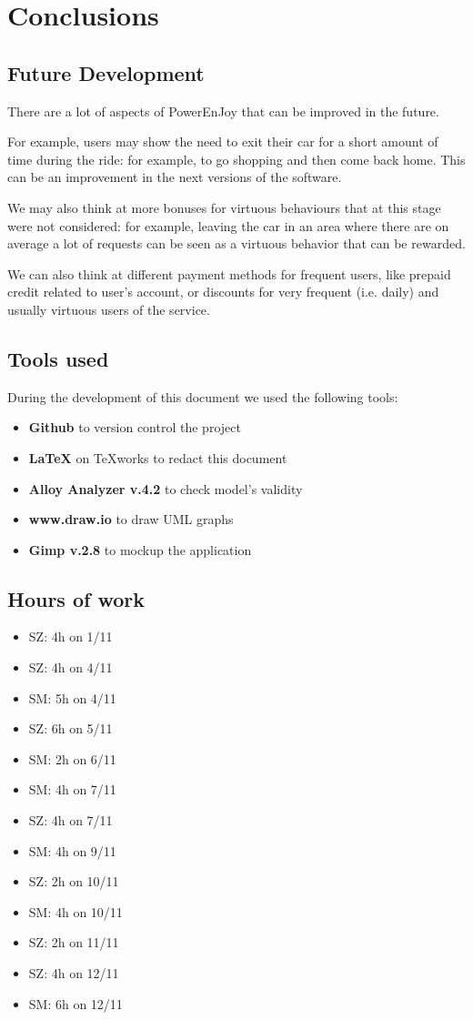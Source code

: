 \documentclass[11pt]{article} %
\newcommand{\pe}{PowerEnJoy }
\begin{document}
\newpage
\section{Conclusions}

\subsection{Future Development}
There are a lot of aspects of \pe that can be improved in the future.

For example, users may show the need to exit their car for a short amount of time during the ride: for example, to go shopping and then come back home. This can be an improvement in the next versions of the software.

We may also think at more bonuses for virtuous behaviours that at this stage were not considered: for example, leaving the car in an area where there are on average a lot of requests can be seen as a virtuous behavior that can be rewarded.

We can also think at different payment methods for frequent users, like prepaid credit related to user's account, or discounts for very frequent (i.e. daily) and usually virtuous users of the service.

\subsection{Tools used}
During the development of this document we used the following tools:
\begin{itemize}
	\item \textbf{Github} to version control the project
	\item \textbf{\LaTeX} on TeXworks to redact this document
	\item \textbf{Alloy Analyzer v.4.2} to check model's validity
	\item \textbf{www.draw.io} to draw UML graphs
	\item \textbf{Gimp v.2.8} to mockup the application
\end{itemize}

\subsection{Hours of work}

\begin{itemize}
	\item SZ: 4h on 1/11
	\item SZ: 4h on 4/11
	\item SM: 5h on 4/11
	\item SZ: 6h on 5/11
	\item SM: 2h on 6/11
	\item SM: 4h on 7/11
	\item SZ: 4h on 7/11
	\item SM: 4h on 9/11
	\item SZ: 2h on 10/11
	\item SM: 4h on 10/11
	\item SZ: 2h on 11/11
	\item SZ: 4h on 12/11
	\item SM: 6h on 12/11
\end{itemize}
\end{document}
